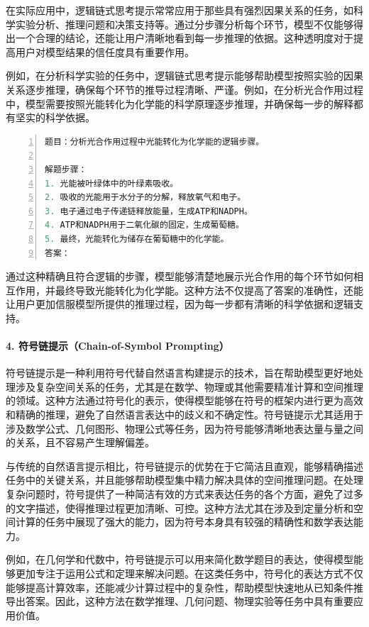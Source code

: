 在实际应用中，逻辑链式思考提示常常应用于那些具有强烈因果关系的任务，如科学实验分析、推理问题和决策支持等。通过分步骤分析每个环节，模型不仅能够得出一个合理的结论，还能让用户清晰地看到每一步推理的依据。这种透明度对于提高用户对模型结果的信任度具有重要作用。

例如，在分析科学实验的任务中，逻辑链式思考提示能够帮助模型按照实验的因果关系逐步推理，确保每个环节的推导过程清晰、严谨。例如，在分析光合作用过程中，模型需要按照光能转化为化学能的科学原理逐步推理，并确保每一步的解释都有坚实的科学依据。



\begin{lstlisting}[language={python},label={},caption={}, basicstyle=\footnotesize\ttfamily, breaklines=true, numbers=left, frame=single]
题目：分析光合作用过程中光能转化为化学能的逻辑步骤。

解题步骤：
1. 光能被叶绿体中的叶绿素吸收。
2. 吸收的光能用于水分子的分解，释放氧气和电子。
3. 电子通过电子传递链释放能量，生成ATP和NADPH。
4. ATP和NADPH用于二氧化碳的固定，生成葡萄糖。
5. 最终，光能转化为储存在葡萄糖中的化学能。
答案：
\end{lstlisting}

通过这种精确且符合逻辑的步骤，模型能够清楚地展示光合作用的每个环节如何相互作用，并最终导致光能转化为化学能。这种方法不仅提高了答案的准确性，还能让用户更加信服模型所提供的推理过程，因为每一步都有清晰的科学依据和逻辑支持。

\paragraph{4. 符号链提示（Chain-of-Symbol Prompting）} 

符号链提示是一种利用符号代替自然语言构建提示的技术，旨在帮助模型更好地处理涉及复杂空间关系的任务，尤其是在数学、物理或其他需要精准计算和空间推理的领域。这种方法通过符号化的表示，使得模型能够在符号的框架内进行更为高效和精确的推理，避免了自然语言表达中的歧义和不确定性。符号链提示尤其适用于涉及数学公式、几何图形、物理公式等任务，因为符号能够清晰地表达量与量之间的关系，且不容易产生理解偏差。

与传统的自然语言提示相比，符号链提示的优势在于它简洁且直观，能够精确描述任务中的关键关系，并且能够帮助模型集中精力解决具体的空间推理问题。在处理复杂问题时，符号提供了一种简洁有效的方式来表达任务的各个方面，避免了过多的文字描述，使得推理过程更加清晰、可控。这种方法尤其在涉及到定量分析和空间计算的任务中展现了强大的能力，因为符号本身具有较强的精确性和数学表达能力。

例如，在几何学和代数中，符号链提示可以用来简化数学题目的表达，使得模型能够更加专注于运用公式和定理来解决问题。在这类任务中，符号化的表达方式不仅能够提高计算效率，还能减少计算过程中的复杂性，帮助模型快速地从已知条件推导出答案。因此，这种方法在数学推理、几何问题、物理实验等任务中具有重要应用价值。

